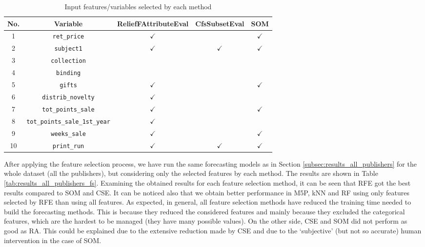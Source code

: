 \documentclass[a4paper,10pt,twocolumn,preprint,3p]{elsarticle}
\begin{document}
\begin{table*}
\caption{Input features/variables selected by each method
\label{tab:features_selected}}
\centering{}%
\begin{tabular}{|c|c|c|c|c|}
\hline 
No. & Variable & ReliefFAttributeEval & CfsSubsetEval & SOM\\
\hline 
1 & \texttt{ret\_price} & $\checkmark$ &  & $\checkmark$\\
\hline 
2 & \texttt{subject1} & $\checkmark$ & $\checkmark$ & $\checkmark$\\
\hline 
3 &  \texttt{collection} &  &  & \\
\hline 
4 & \texttt{binding} &  &  & \\
\hline 
5 & \texttt{gifts} & $\checkmark$ &  & $\checkmark$\\
\hline 
6 & \texttt{distrib\_novelty} & $\checkmark$ &  & \\
\hline 
7 & \texttt{tot\_points\_sale} & $\checkmark$ &  & $\checkmark$\\
\hline 
8 & \texttt{tot\_points\_sale\_1st\_year} & $\checkmark$ &  & \\
\hline 
9 & \texttt{weeks\_sale} & $\checkmark$ &  & $\checkmark$\\
\hline 
10 & \texttt{print\_run} & $\checkmark$ & $\checkmark$ & $\checkmark$\\
\hline 
\end{tabular}
\end{table*}


After applying the feature selection process, we have run the same
forecasting models as in Section \ref{subsec:results_all_publishers}
for the whole dataset (all the publishers), but considering only the
selected features by each method. The results are shown in Table
\ref{tab:results_all_publishers_fs}. Examining the obtained results
for each feature selection method, it can be seen that RFE got the
best results compared to SOM and CSE. It can be noticed also that we
obtain better performance in M5P, kNN and RF using only features
selected by RFE than using all features. %
As expected, in general, all feature selection methods have reduced the training time needed to build the forecasting methods. This is because they reduced the considered features and mainly because they excluded the categorical features, which are the hardest to be managed (they have many possible values). On the other side, CSE and SOM did not perform as good as RA. This could be explained due to the extensive reduction made by CSE and due to the `subjective' (but not so accurate) human intervention in the case of SOM. 
\end{document}
